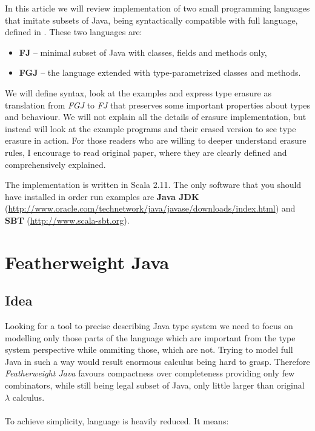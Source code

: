\documentclass{article}[12pt]
\begin{document}
In this article we will review implementation of two small programming languages that imitate subsets of Java, being syntactically compatible with full language, defined in \cite{fj}.
These two languages are:

\begin{itemize}
\item{\textbf{FJ}} -- minimal subset of Java with classes, fields and methods only,
\item{\textbf{FGJ}} -- the language extended with type-parametrized classes and methods.
\end{itemize}


We will define syntax, look at the examples and express type erasure as translation from \emph{FGJ} to \emph{FJ} that preserves some important properties about types and behaviour. We will not explain all the details of erasure implementation, but instead will look at the example programs and their erased version to see type erasure in action. For those readers who are willing to deeper understand erasure rules, I encourage to read original paper, where they are clearly defined and comprehensively explained.

The implementation is written in Scala 2.11. The only software that you should have installed in order run examples are \textbf{Java JDK} (\url{http://www.oracle.com/technetwork/java/javase/downloads/index.html}) and \textbf{SBT} (\url{http://www.scala-sbt.org}).

\section{Featherweight Java}

\subsection{Idea}

Looking for a tool to precise describing Java type system we need to focus on modelling only those parts of the language which are important from the type system perspective while ommiting those, which are not. Trying to model full Java in such a way would result enormous calculus being hard to grasp. Therefore \emph{Featherweight Java} favours compactness over completeness providing only few combinators, while still being legal subset of Java, only little larger than original $\lambda$ calculus.
\\
\\
To achieve simplicity, language is heavily reduced. It means:
\end{document}
